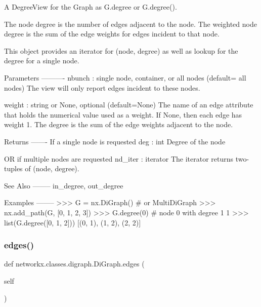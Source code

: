 \begin{DoxyVerb}A DegreeView for the Graph as G.degree or G.degree().

The node degree is the number of edges adjacent to the node.
The weighted node degree is the sum of the edge weights for
edges incident to that node.

This object provides an iterator for (node, degree) as well as
lookup for the degree for a single node.

Parameters
----------
nbunch : single node, container, or all nodes (default= all nodes)
    The view will only report edges incident to these nodes.

weight : string or None, optional (default=None)
   The name of an edge attribute that holds the numerical value used
   as a weight.  If None, then each edge has weight 1.
   The degree is the sum of the edge weights adjacent to the node.

Returns
-------
If a single node is requested
deg : int
    Degree of the node

OR if multiple nodes are requested
nd_iter : iterator
    The iterator returns two-tuples of (node, degree).

See Also
--------
in_degree, out_degree

Examples
--------
>>> G = nx.DiGraph()  # or MultiDiGraph
>>> nx.add_path(G, [0, 1, 2, 3])
>>> G.degree(0)  # node 0 with degree 1
1
>>> list(G.degree([0, 1, 2]))
[(0, 1), (1, 2), (2, 2)]\end{DoxyVerb}
 \mbox{\label{classnetworkx_1_1classes_1_1digraph_1_1DiGraph_adc0f55268d29fba843fc4a24ada556df}} 
\subsubsection{\texorpdfstring{edges()}{edges()}}
{\footnotesize\ttfamily def networkx.\+classes.\+digraph.\+Di\+Graph.\+edges (\begin{DoxyParamCaption}\item[{}]{self }\end{DoxyParamCaption})}

